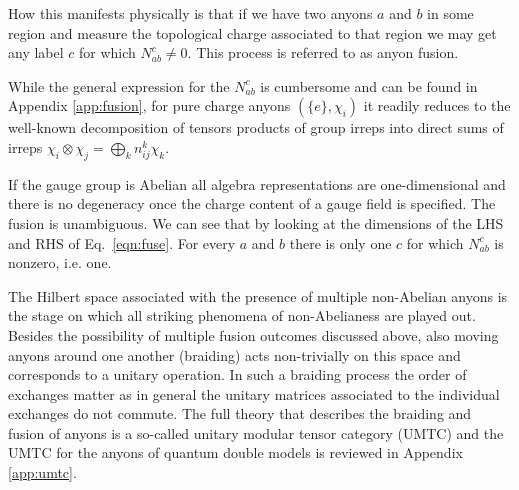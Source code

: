 \documentclass[two column]{article}
\begin{document}
How this manifests physically is that if we have two anyons $a$ and $b$ in some region and measure the topological charge associated to that region we may get any label $c$ for which $N_{ab}^c \neq 0$. This process is referred to as anyon fusion.

While the general expression for the $N_{ab}^c$ is cumbersome and can be found in Appendix \ref{app:fusion}, for pure charge anyons $(\{e\}, \chi_i)$ it readily reduces to the well-known  decomposition of tensors products of group irreps into direct sums of irreps $\chi_i\otimes\chi_j = \bigoplus_k n^k_{ij} \chi_k$.

If the gauge group is Abelian all algebra representations are one-dimensional and there is no degeneracy once the charge content of a gauge field is specified. The fusion is unambiguous. 
We can see that by looking at the dimensions of the LHS and RHS of Eq.~\eqref{eqn:fuse}. For every $a$ and $b$ there is only one $c$ for which $N_{ab}^c$ is nonzero, i.e. one.

The Hilbert space associated with the presence of multiple non-Abelian anyons is the stage on which all striking phenomena of non-Abelianess are played out. Besides the possibility of multiple fusion outcomes discussed above,  also moving anyons around one another (braiding) acts non-trivially on this space and corresponds to a unitary operation. In such a braiding process the order of exchanges matter as in general the unitary matrices associated to the individual exchanges do not commute. The full theory that describes the braiding and fusion of anyons is a so-called unitary modular tensor category (UMTC)\cite{Kitaev_2003} and the UMTC for the anyons of quantum double models is reviewed in Appendix \ref{app:umtc}.
\end{document}
